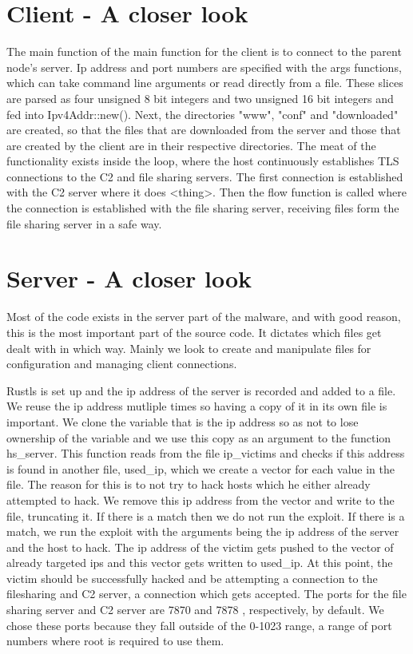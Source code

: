 \documentclass[../main.tex]{subfiles}
\begin{document}
	\vspace{10pt}
	\section{Client - A closer look}


The main function of the main function for the client is to connect to the parent node's server. Ip address and port numbers are specified with the args functions, which can take
command line arguments or read directly from a file. These slices are parsed as four unsigned 8 bit integers and two unsigned 16 bit integers and fed into Ipv4Addr::new().
Next, the directories "www", "conf" and "downloaded" are created, so that the files that are downloaded from the server and those that are created by the client are in their respective
directories. The meat of the functionality exists inside the loop, where the host continuously establishes TLS connections to the C2 and file sharing servers. The first connection is 
established with the C2 server where it does <thing>. Then the flow function is called where the connection is established with the file sharing server, receiving files form the file
sharing server in a safe way.
	\vspace{10pt}

	\section{Server -  A closer look}


Most of the code exists in the server part of the malware, and with good reason, this is the most important part of the source code. It dictates which files get dealt with in which way.
Mainly we look to create and manipulate files for configuration and managing client connections.

Rustls is set up and the ip address of the server is recorded and added to a file. We reuse the ip address mutliple times so having a copy of it in its own file is important. We clone
the variable that is the ip address so as not to lose ownership of the variable and we use this copy as an argument to the function hs_server. This function reads from the file 
ip_victims and checks if this address is found in another file, used_ip, which we create a vector for each value in the file. The reason for this is to not try to hack hosts which 
he either already attempted to hack. We remove this ip address from the vector and write to the file, truncating it. If there is a match then we do not run the exploit. If there is a
match, we run the exploit with the arguments being the ip address of the server and the host to hack. The ip address of the victim gets pushed to the vector of already targeted ips and
this vector gets written to used_ip. At this point, the victim should be successfully hacked and be attempting a connection to the filesharing and C2 server, a connection which 
gets accepted. The ports for the file sharing server and C2 server are 7870 and 7878 , respectively, by default. We chose these ports because they fall outside of the 0-1023 range,
a range of port numbers where root is required to use them.

	\vspace{10pt}
\end{document}
